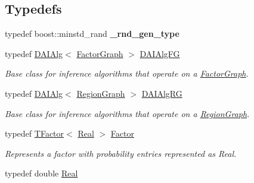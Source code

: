 \subsection*{Typedefs}
\begin{CompactItemize}
\item 
\hypertarget{namespacedai_d2fa14208786f0746805efc9fbf3e56e}{
typedef boost::minstd\_\-rand \textbf{\_\-rnd\_\-gen\_\-type}}
\label{namespacedai_d2fa14208786f0746805efc9fbf3e56e}

\item 
\hypertarget{namespacedai_4d66d71f2b2c7ac4845bba057eb7cee5}{
typedef \hyperlink{classdai_1_1DAIAlg}{DAIAlg}$<$ \hyperlink{classdai_1_1FactorGraph}{FactorGraph} $>$ \hyperlink{namespacedai_4d66d71f2b2c7ac4845bba057eb7cee5}{DAIAlgFG}}
\label{namespacedai_4d66d71f2b2c7ac4845bba057eb7cee5}

\begin{CompactList}\small\item\em Base class for inference algorithms that operate on a \hyperlink{classdai_1_1FactorGraph}{FactorGraph}. \item\end{CompactList}\item 
\hypertarget{namespacedai_6b5cb6d79a324915d2c88ad368437e21}{
typedef \hyperlink{classdai_1_1DAIAlg}{DAIAlg}$<$ \hyperlink{classdai_1_1RegionGraph}{RegionGraph} $>$ \hyperlink{namespacedai_6b5cb6d79a324915d2c88ad368437e21}{DAIAlgRG}}
\label{namespacedai_6b5cb6d79a324915d2c88ad368437e21}

\begin{CompactList}\small\item\em Base class for inference algorithms that operate on a \hyperlink{classdai_1_1RegionGraph}{RegionGraph}. \item\end{CompactList}\item 
\hypertarget{namespacedai_7515abf9952cd312e95a34ada0670e85}{
typedef \hyperlink{classdai_1_1TFactor}{TFactor}$<$ \hyperlink{namespacedai_e7d0472fdc89a8635825d01940e91cbf}{Real} $>$ \hyperlink{namespacedai_7515abf9952cd312e95a34ada0670e85}{Factor}}
\label{namespacedai_7515abf9952cd312e95a34ada0670e85}

\begin{CompactList}\small\item\em Represents a factor with probability entries represented as Real. \item\end{CompactList}\item 
\hypertarget{namespacedai_e7d0472fdc89a8635825d01940e91cbf}{
typedef double \hyperlink{namespacedai_e7d0472fdc89a8635825d01940e91cbf}{Real}}
\label{namespacedai_e7d0472fdc89a8635825d01940e91cbf}


\end{CompactItemize}

